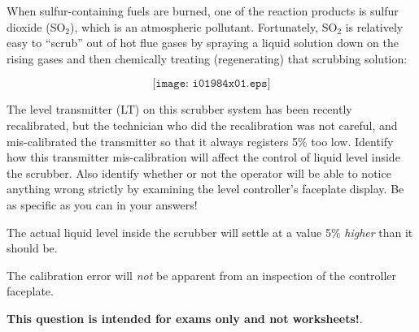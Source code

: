 

When sulfur-containing fuels are burned, one of the reaction products is sulfur dioxide (SO$_{2}$), which is an atmospheric pollutant.  Fortunately, SO$_{2}$ is relatively easy to ``scrub'' out of hot flue gases by spraying a liquid solution down on the rising gases and then chemically treating (regenerating) that scrubbing solution:

$$\texttt{[image: i01984x01.eps]}$$

The level transmitter (LT) on this scrubber system has been recently recalibrated, but the technician who did the recalibration was not careful, and mis-calibrated the transmitter so that it always registers 5\% too low.  Identify how this transmitter mis-calibration will affect the control of liquid level inside the scrubber.  Also identify whether or not the operator will be able to notice anything wrong strictly by examining the level controller's faceplate display.  Be as specific as you can in your answers!







The actual liquid level inside the scrubber will settle at a value 5\% {\it higher} than it should be.

\vskip 10pt

The calibration error will {\it not} be apparent from an inspection of the controller faceplate.







{\bf This question is intended for exams only and not worksheets!}.



